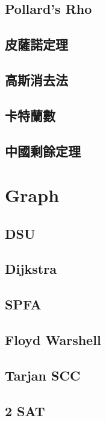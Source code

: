 \subsection{Pollard's Rho} 

\subsection{皮薩諾定理} 

\subsection{高斯消去法}

\subsection{卡特蘭數}

\subsection{中國剩餘定理}


\section{Graph}
\subsection{DSU} 

\subsection{Dijkstra} 

\subsection{SPFA} 

\subsection{Floyd Warshell} 

\subsection{Tarjan SCC} 

\subsection{2 SAT} 

